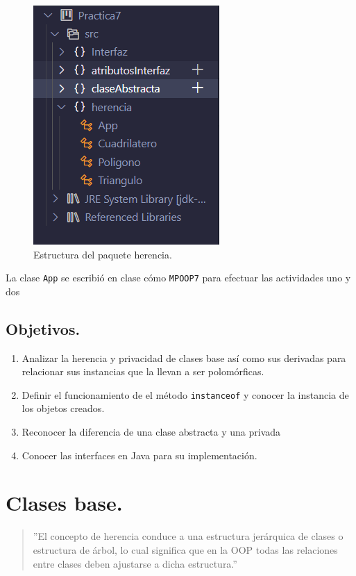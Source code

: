 \documentclass[conference]{IEEEtran}
\begin{document}
        \begin{figure}[htbp]
            \centerline{\includegraphics[scale=0.8]{./pics/1}}
            \caption{Estructura del paquete herencia.}
            \label{fig}
        \end{figure}

        La clase \texttt{App} se escribió en clase cómo \texttt{MPOOP7}  para efectuar las actividades uno y dos 
        \subsection{Objetivos.}
            \begin{enumerate}
                \item Analizar la herencia y privacidad de clases base así como sus derivadas para relacionar sus instancias que la llevan a ser polomórficas.
                \item Definir el funcionamiento de el método \texttt{instanceof} y conocer la instancia de los objetos creados.
                \item Reconocer la diferencia de una clase abstracta y una privada
                \item Conocer las interfaces en Java para su implementación.
            \end{enumerate}
    
        \section{Clases base.}
    
        \begin{quote}
        ''El concepto de herencia conduce a una estructura jerárquica de clases o estructura de árbol, lo cual significa que en la OOP todas las relaciones entre clases deben ajustarse a dicha estructura.'' \cite{IEEEexample:ProgramacionConJava}
        \end{quote}
\end{document}
